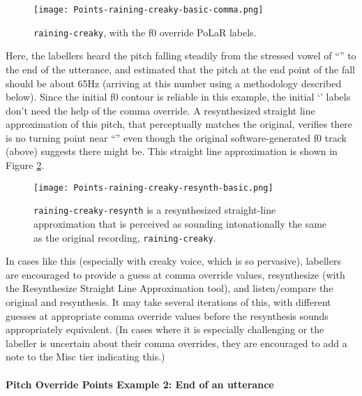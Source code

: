 \begin{figure}[H]
\centering
%
\texttt{[image: Points-raining-creaky-basic-comma.png]}
%
\caption{\texttt{raining-creaky}, with the f0 override PoLaR labels.%
\label{fig:raining-creaky Points comma}%
%
}
\end{figure}

Here, the labellers heard the pitch falling steadily from the stressed vowel of “” to the end of the utterance, and estimated that the pitch at the end point of the fall should be about 65Hz (arriving at this number using a methodology described below). Since the initial f0 contour is reliable in this example, the initial ‘’ labels don’t need the help of the comma override. A resynthesized straight line approximation of this pitch, that perceptually matches the original, verifies there is no turning point near “” even though the original software-generated f0 track (above) suggests there might be. This straight line approximation is shown in Figure \ref{fig:raining-creaky Points basic resynth}.

\begin{figure}[H]
\centering
%
\texttt{[image: Points-raining-creaky-resynth-basic.png]}
%
\caption{\texttt{raining-creaky-resynth} is a resynthesized straight-line approximation that is perceived as sounding intonationally the same as the original recording, \texttt{raining-creaky}.%
\label{fig:raining-creaky Points basic resynth}%
%
}
\end{figure}

In cases like this (especially with creaky voice, which is so pervasive), labellers are encouraged to provide a guess at comma override values, resynthesize (with the Resynthesize Straight Line Approximation tool), and listen\slash compare the original and resynthesis. It may take several iterations of this, with different guesses at appropriate comma override values before the resynthesis sounds appropriately equivalent. (In cases where it is especially challenging or the labeller is uncertain about their comma overrides, they are encouraged to add a note to the Misc tier indicating this.) 

\paragraph{Pitch Override Points Example 2: End of an utterance\label{pitch-override-points-example-2}}


